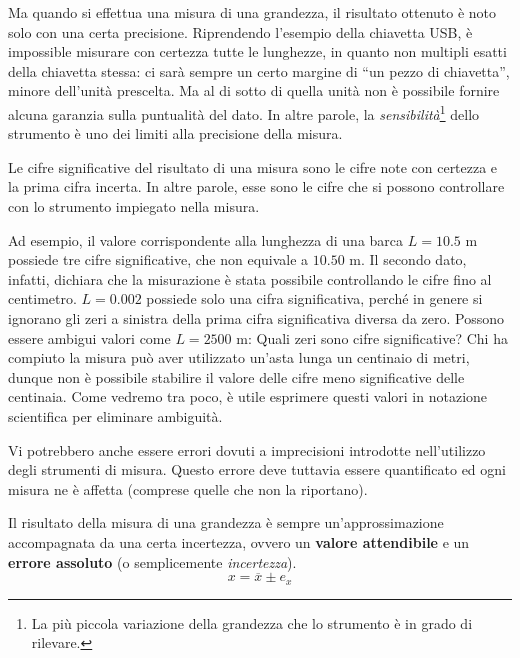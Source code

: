 Ma quando si effettua una misura di una grandezza, il risultato ottenuto è noto solo
con una certa precisione. Riprendendo l'esempio della chiavetta USB, è impossible
misurare con certezza tutte le lunghezze, in quanto non multipli esatti della
chiavetta stessa: ci sarà sempre un certo margine di ``un pezzo di chiavetta'',
minore dell'unità prescelta. Ma al di sotto di quella unità non è possibile
fornire alcuna garanzia sulla puntualità del dato. In altre parole, la
\textit{sensibilità}\footnote{La più piccola variazione della grandezza che lo
strumento è in grado di rilevare.} dello strumento è uno dei limiti alla precisione
della misura.

\begin{tcolorbox}[colback = yellow!30, colframe = yellow!30!black, title = {Cifre significative del risultato di una misura}]
Le cifre significative del risultato di una misura sono le cifre note
con certezza e la prima cifra incerta. In altre parole, esse sono le cifre che si
possono controllare con lo strumento impiegato nella misura.
\end{tcolorbox}

\noindent Ad esempio, il valore corrispondente alla lunghezza di una barca $L = 10.5$ m
possiede tre cifre significative, che non equivale a $10.50$ m. Il secondo dato,
infatti, dichiara che la misurazione è stata possibile controllando le cifre
fino al centimetro. $L = 0.002$ possiede solo una cifra significativa, perché
in genere si ignorano gli zeri a sinistra della prima cifra significativa diversa
da zero. Possono essere ambigui valori come $L = 2500 \text{ m}$: Quali zeri sono
cifre significative? Chi ha compiuto la misura può aver utilizzato un'asta lunga
un centinaio di metri, dunque non è possibile stabilire il valore delle cifre
meno significative delle centinaia. Come vedremo tra poco, è utile esprimere questi valori in
notazione scientifica per eliminare ambiguità.

Vi potrebbero anche essere errori dovuti a imprecisioni introdotte nell'utilizzo
degli strumenti di misura. Questo errore deve tuttavia essere quantificato ed ogni
misura ne è affetta (comprese quelle che non la riportano).

\begin{tcolorbox}[colback = yellow!30, colframe = yellow!30!black, title = {Risultato della misura di una grandezza}]
Il risultato della misura di una grandezza è sempre un'approssimazione
accompagnata da una certa incertezza, ovvero un \textbf{valore attendibile}
e un \textbf{errore assoluto} (o semplicemente \textit{incertezza}).
\[ x = \overline{x} \pm e_x  \]
\end{tcolorbox}

